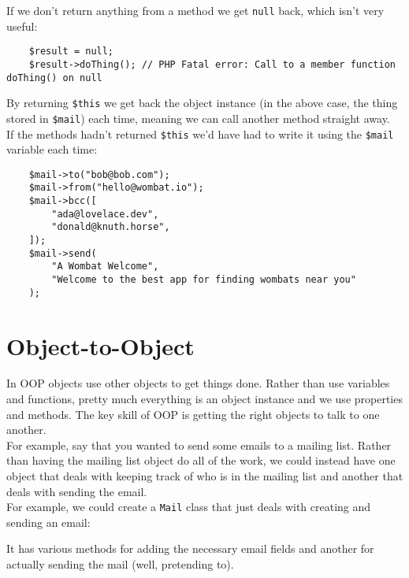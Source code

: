 If we don't return anything from a method we get \texttt{null} back, which isn't very useful:

\begin{verbatim}
    $result = null;
    $result->doThing(); // PHP Fatal error: Call to a member function doThing() on null
\end{verbatim}

By returning \texttt{\$this} we get back the object instance (in the above case, the thing stored in \texttt{\$mail}) each time, meaning we can call another method straight away.
\\

If the methods hadn't returned \texttt{\$this} we'd have had to write it using the \texttt{\$mail} variable each time:

\begin{verbatim}
    $mail->to("bob@bob.com");
    $mail->from("hello@wombat.io");
    $mail->bcc([
        "ada@lovelace.dev",
        "donald@knuth.horse",
    ]);
    $mail->send(
        "A Wombat Welcome",
        "Welcome to the best app for finding wombats near you"
    );
\end{verbatim}



\section{Object-to-Object}

In OOP objects use other objects to get things done. Rather than use variables and functions, pretty much everything is an object instance and we use properties and methods. The key skill of OOP is getting the right objects to talk to one another.
\\

For example, say that you wanted to send some emails to a mailing list. Rather than having the mailing list object do all of the work, we could instead have one object that deals with keeping track of who is in the mailing list and another that deals with sending the email.
\\

For example, we could create a \texttt{Mail} class that just deals with creating and sending an email:


It has various methods for adding the necessary email fields and another for actually sending the mail (well, pretending to).
\\


